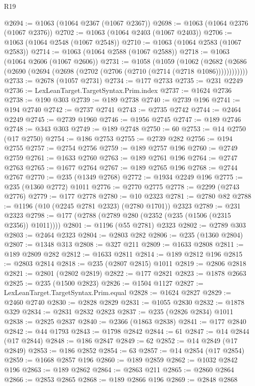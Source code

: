 \begin{lexlean}{R19}
\begin{coremodule}
@2694 := @1063 (@1064 @2367 (@1067 @2367))
@2698 := @1063 (@1064 @2376 (@1067 @2376))
@2702 := @1063 (@1064 @2403 (@1067 @2403))
@2706 := @1063 (@1064 @2548 (@1067 @2548))
@2710 := @1063 (@1064 @2583 (@1067 @2583))
@2714 := @1063 (@1064 @2588 (@1067 @2588))
@2718 := @1063 (@1064 @2606 (@1067 @2606))
@2731 := @1058
    (@1059
      (@1062 (@2682 (@2686 (@2690 (@2694 (@2698 (@2702 (@2706 (@2710 (@2714 (@2718 @1086))))))))))))
@2733 := @2678 (@1057 @2731)
@2734 := @177 @2733
@2735 := @231 @2249
@2736 := LexLeanTarget.TargetSyntax.Prim.index
@2737 := @1624 @2736
@2738 := @190 @303
@2739 := @189 @2738
@2740 := @2739 @196
@2741 := @194 @2740
@2742 := @2737 @2741
@2743 := @2735 @2742
@2744 := @2464 @2249
@2745 := @2739 @1960
@2746 := @1956 @2745
@2747 := @189 @2746
@2748 := @343 @303
@2749 := @189 @2748
@2750 := 60
@2753 := @14 @2750 (@17 @2750)
@2754 := @186 @2753
@2755 := @2739 @282
@2756 := @194 @2755
@2757 := @2754 @2756
@2759 := @189 @2757 @196
@2760 := @2749 @2759
@2761 := @1633 @2760
@2763 := @189 @2761 @196
@2764 := @2747 @2763
@2765 := @1677 @2764
@2767 := @189 @2765 @196
@2768 := @2744 @2767
@2770 := @235 (@1349 @2768)
@2772 := @1934 @2249 @196
@2775 := @235 (@1360 @2772) @1011
@2776 := @2770 @2775
@2778 := @2299 (@2743 @2776)
@2779 := @177 @2778
@2780 := @10 @2323
@2781 := @2780 @82
@2788 := @1196 (@10 (@2245 @2781 @2323) (@2780 @1701)) @2323
@2789 := @231 @2323
@2798 := @177 (@2788 (@2789 @280 (@2352 (@235 (@1506 (@2315 @2356)) @1011))))
@2801 := @1196 (@55 @2781) @2323
@2802 := @2789 @303
@2803 := @2464 @2323
@2804 := @2803 @282
@2806 := @235 (@1360 @2804)
@2807 := @1348 @313
@2808 := @327 @211
@2809 := @1633 @2808
@2811 := @189 @2809 @282
@2812 := @1633 @2811
@2814 := @189 @2812 @196
@2815 := @2803 @2814
@2818 := @235 (@2807 @2815) @1011
@2819 := @2806 @2818
@2821 := @2801 (@2802 @2819)
@2822 := @177 @2821
@2823 := @1878 @2663
@2825 := @235 (@1500 @2823)
@2826 := @1504 @1127
@2827 := LexLeanTarget.TargetSyntax.Prim.equal
@2828 := @1624 @2827
@2829 := @2460 @2740
@2830 := @2828 @2829
@2831 := @1055 @2830
@2832 := @1878 @329
@2834 := @2831 @2832 @2823
@2837 := @235 (@2826 @2834) @1011
@2838 := @2825 @2837
@2840 := @2366 (@1863 @2838)
@2841 := @177 @2840
@2842 := @44 @1793
@2843 := @1798 @2842
@2844 := 61
@2847 := @14 @2844 (@17 @2844)
@2848 := @186 @2847
@2849 := 62
@2852 := @14 @2849 (@17 @2849)
@2853 := @186 @2852
@2854 := 63
@2857 := @14 @2854 (@17 @2854)
@2859 := @1668 @2857 @196
@2860 := @189 @2859
@2862 := @1032 @2842 @196
@2863 := @189 @2862
@2864 := @2863 @211
@2865 := @2860 @2864
@2866 := @2853 @2865
@2868 := @189 @2866 @196
@2869 := @2848 @2868

\end{coremodule}
\end{lexlean}
